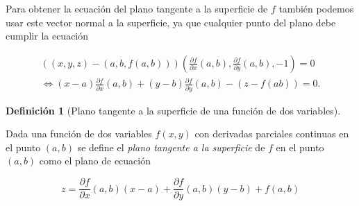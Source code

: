 \documentclass[
  a4paper,
]{scrreport}
\theoremstyle{definition}
\newtheorem{definition}{Definición}[chapter]
\theoremstyle{plain}
\theoremstyle{plain}
\theoremstyle{definition}
\theoremstyle{definition}
\theoremstyle{plain}
\theoremstyle{remark}
\begin{document}
Para obtener la ecuación del plano tangente a la superficie de \(f\)
también podemos usar este vector normal a la superficie, ya que
cualquier punto del plano debe cumplir la ecuación

\[
\begin{gathered}
((x,y,z)-(a,b,f(a,b)))\left(\frac{\partial f}{\partial x}(a,b), \frac{\partial f}{\partial y}(a,b), -1\right) = 0 \\
\Leftrightarrow (x-a)\frac{\partial f}{\partial x}(a,b) + (y-b)\frac{\partial f}{\partial y}(a,b) - (z-f(ab)) = 0.
\end{gathered}
\]

\begin{definition}[Plano tangente a la superficie de una función de dos
variables]\protect\hypertarget{def-plano-tangente-superficie}{}\label{def-plano-tangente-superficie}

Dada una función de dos variables \(f(x,y)\) con derivadas parciales
continuas en el punto \((a,b)\) se define el \emph{plano tangente a la
superficie} de \(f\) en el punto \((a,b)\) como el plano de ecuación

\[
z = \frac{\partial f}{\partial x}(a,b)(x-a) + \frac{\partial f}{\partial y}(a,b)(y-b)+f(a,b)
\]

\end{definition}
\end{document}
